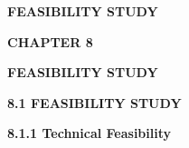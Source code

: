 \vspace*{\fill}
\begin{center}
  {\fontsize{18pt}{24pt}\selectfont\bfseries FEASIBILITY STUDY\par}
\end{center}
\vspace*{\fill}
\newpage

\begin{center}
  {\fontsize{16pt}{20pt}\selectfont\bfseries CHAPTER 8\par}
  \vspace{0.3cm}
  {\fontsize{16pt}{20pt}\selectfont\bfseries FEASIBILITY STUDY\par}
\end{center}
\vspace{0.4cm}

{\fontsize{14pt}{18pt}\selectfont\bfseries 8.1 FEASIBILITY STUDY\par}
\vspace{0.2cm}
{\fontsize{13pt}{17pt}\selectfont\bfseries 8.1.1 Technical Feasibility\par}
\vspace{0.2cm}


